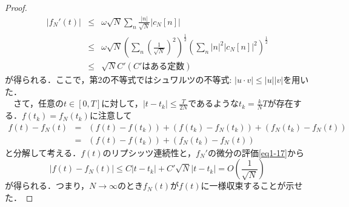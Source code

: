 \documentclass[a4j]{jsbook}
\numberwithin{theorem}{chapter}  %
\begin{document}
\begin{proof}
\begin{eqnarray}
|f_N'(t)|&\leq&\omega\sqrt{N}\sum_{n}\frac{|n|}{\sqrt{N}}|c_N[n]| \nonumber \\
&\leq&\omega\sqrt{N}\left(\sum_{n}\left(\frac{1}{\sqrt{N}}\right)^2\right)^{\frac{1}{2}}\left(\sum_{n}|n|^2|c_N[n]|^2\right)^{\frac{1}{2}} \nonumber \\
&\leq&\sqrt{N}C' (C'\mbox{はある定数}) \label{eq1-17}
\end{eqnarray}
が得られる．ここで，第2の不等式ではシュワルツの不等式: \(|u\cdot v|\leq|u||v|\)を用いた．\\
　さて，任意の\(t\in[0, T]\)に対して，\(\displaystyle |t-t_k|\leq\frac{T}{2N}\)であるような\(\displaystyle t_k=\frac{k}{N}T\)が存在する．\(f(t_k)=f_N(t_k)\)に注意して
\begin{eqnarray*}
f(t)-f_N(t)&=&(f(t)-f(t_k))+(f(t_k)-f_N(t_k))+(f_N(t_k)-f_N(t)) \\
&=&(f(t)-f(t_k))+(f_N(t_k)-f_N(t))
\end{eqnarray*}
と分解して考える．\(f(t)\)のリプシッツ連続性と，\(f_N'\)の微分の評価\eqref{eq1-17}から
\begin{equation*}
    |f(t)-f_N(t)|\leq C|t-t_k|+C'\sqrt{N}|t-t_k|=O\left(\frac{1}{\sqrt{N}}\right)
\end{equation*}
が得られる．つまり，\(N\to\infty\)のとき\(f_N(t)\)が\(f(t)\)に一様収束することが示せた．
\end{proof}
\end{document}
